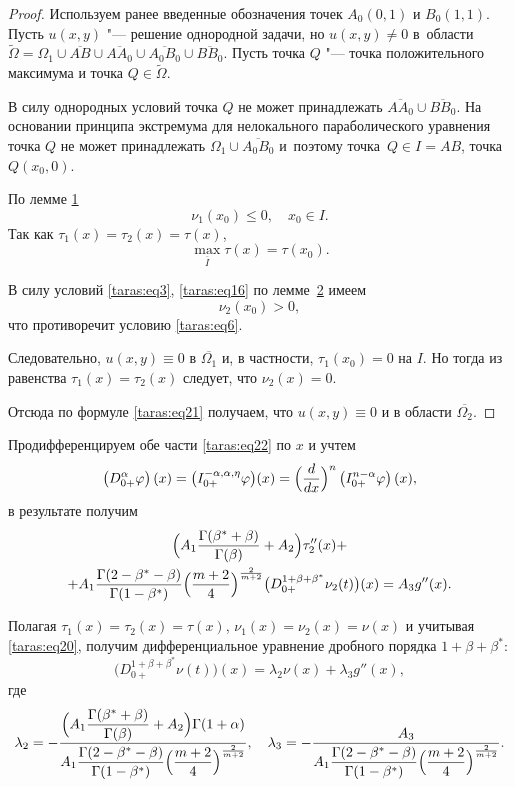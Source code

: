 \smallskip

\begin{proof}
Используем ранее введенные обозначения точек $A_{0}(0, 1)$ и  $B_{0}(1, 1)$. 
Пусть $u(x,y)$ "--- решение однородной задачи, но $u(x,y) \ne 0$ 
в~области $\widetilde{ \Omega} = \Omega_{1} \cup \overline{AB} \cup \overline{AA_{0}} \cup \overline{A_{0}B_{0}} \cup \overline{BB_{0}}$. 
Пусть точка $Q$ "--- точка положительного максимума и точка $Q \in \widetilde{ \Omega}$.

В силу однородных условий точка $Q$ не может принадлежать $\overline{AA_{0}} \cup \overline{BB_{0}}$. 
На основании принципа экстремума для нелокального параболического уравнения \cite[с.~47]{taras:9} точка $Q$ не может принадлежать $\Omega_{1} \cup \overline{A_{0}B_{0}}$ и~поэтому  точка~$Q \in I = AB$, точка $Q(x_{0}, 0)$.

По лемме \hyperlink{taras:l1}{1} $$\nu_{1}(x_{0}) \le0,\quad  x_{0} \in I.$$ 
Так как $\tau_{1}(x)= \tau_{2}(x)= \tau(x)$, $$ \underset {\overline{I}}{\max }  \tau(x)= \tau(x_{0}).$$

В силу условий \eqref{taras:eq3}, \eqref{taras:eq16} по лемме~\hyperlink{taras:l2}{2} имеем $$\nu_{2}(x_{0}) >0,$$ что противоречит условию \eqref{taras:eq6}.

Следовательно, $u(x,y) \equiv 0$ в $\overline {\Omega_{1}}$ и, в частности, $\tau_{1}(x_{0})=0$ на $I$. 
Но тогда из равенства $\tau_{1}(x)= \tau_{2}(x)$ следует, что $\nu_{2}(x)=0$.

Отсюда по формуле \eqref{taras:eq21} получаем, что $u(x,y) \equiv 0$ и в области $\overline{ \Omega_{2}}$.
\end{proof}


\bigskip
{}
Продифференцируем обе части \eqref{taras:eq22} по $x$ и учтем
\[
\left( D_{0+}^{ \alpha} \varphi \right) (x) = \bigl( I_{0+}^{ -\alpha, \alpha, \eta} \varphi \bigr) (x) = 
\Bigl( \frac{d}{dx} \Bigr)^{n} \left(I_{0+}^{n- \alpha} \varphi \right) (x),
\]
в результате получим
\begin{multline}
\label{taras:eq24} 
\Bigl(  A_{1} \frac{\Gamma( \beta^{*}+ \beta)}{ \Gamma( \beta)} + A_{2} \Bigr) \tau''_{2}(x)+ \\
+ A_{1} \frac{ \Gamma(2- \beta^{*}- \beta)}{ \Gamma(1- \beta^{*})} 
\Bigl( \frac{m+2}{4} \Bigr)^{\frac{2}{m+2}} \bigl( D_{0+}^{1+ \beta+\beta^{*}} \nu_{2} (t)\bigr)  (x)=A_{3} g''(x).
\end{multline}

Полагая $\tau_{1}(x)=\tau_{2}(x)=\tau(x)$, $\nu_{1}(x)=\nu_{2}(x)=\nu(x)$ и учитывая \eqref{taras:eq20}, получим дифференциальное уравнение дробного порядка $ 1+ \beta+\beta^{*}$:
\begin{equation}
\label{taras:eq25}
\bigl( D_{0+}^{1+ \beta+\beta^{*}} \nu(t) \bigr)(x)= \lambda_{2} \nu(x)+\lambda_{3} g''(x),
\end{equation}
где
\[
\lambda_{2}=
-\frac{ \Bigl( A_{1}\dfrac{\Gamma( \beta^{*}+ \beta)}{ \Gamma( \beta)} +A_{2} \Bigr) \Gamma(1+\alpha)}{A_{1} \dfrac{ \Gamma(2- \beta^{*}- \beta)}{ \Gamma(1- \beta^{*})} \Bigl( \dfrac{m+2}{4} \Bigr)^{\frac{2}{m+2} }}, \quad
\lambda_{3}=-\frac{ A_{3}}{A_{1} \dfrac{ \Gamma(2- \beta^{*}- \beta)}{ \Gamma(1- \beta^{*})} \Bigl( \dfrac{m+2}{4} \Bigr)^{\frac{2}{m+2} }}.
\]

